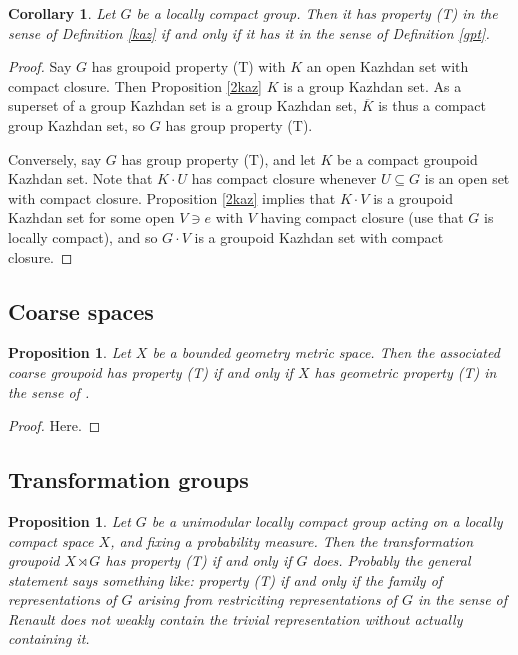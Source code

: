 \documentclass{article}
\theoremstyle{plain}
\newtheorem{corollary}[theorem]{Corollary}
\newtheorem{proposition}[theorem]{Proposition}
\theoremstyle{definition}
\theoremstyle{remark}
\begin{document}
\begin{corollary}\label{gpgpd}
Let $G$ be a locally compact group.  Then it has property (T) in the sense of Definition \ref{kaz} if and only if it has it in the sense of Definition \ref{gpt}. 
\end{corollary}

\begin{proof}
Say $G$ has groupoid property (T) with $K$ an open Kazhdan set with compact closure.  Then Proposition \ref{2kaz} $K$ is a group Kazhdan set.  As a superset of a group Kazhdan set is a group Kazhdan set, $\overline{K}$ is thus a compact group Kazhdan set, so $G$ has group property (T).  

Conversely, say $G$ has group property (T), and let $K$ be a compact groupoid Kazhdan set.  Note that $K\cdot U$ has compact closure whenever $U\subseteq G$ is an open set with compact closure.  Proposition \ref{2kaz} implies that $K\cdot V$ is a groupoid Kazhdan set for some open $V\owns e$ with $V$ having compact closure (use that $G$ is locally compact), and so $G\cdot V$ is a groupoid Kazhdan set with compact closure.
\end{proof}






\subsection*{Coarse spaces}

\begin{proposition}\label{coarse t}
Let $X$ be a bounded geometry metric space.  Then the associated coarse groupoid has property (T) if and only if $X$ has geometric property (T) in the sense of \cite[Definition 3.3]{Willett:2013cr}.
\end{proposition}

\begin{proof}
Here.
\end{proof}




\subsection*{Transformation groups}

\begin{proposition}\label{trans t}
Let $G$ be a unimodular locally compact group acting on a locally compact space $X$, and fixing a probability measure.  Then the transformation groupoid $X\rtimes G$ has property (T) if and only if $G$ does.  Probably the general statement says something like: property (T) if and only if the family of representations of $G$ arising from restriciting representations of $G$ in the sense of Renault does not weakly contain the trivial representation without actually containing it.
\end{proposition} 
\end{document}
